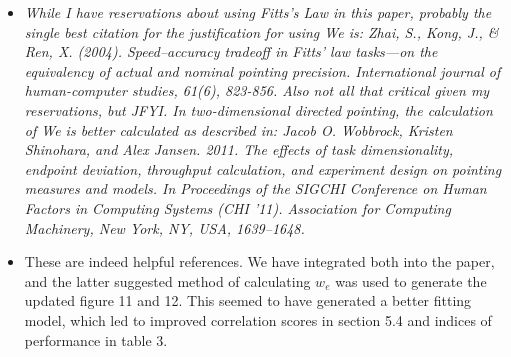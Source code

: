 \documentclass{scrartcl}
\begin{document}
\begin{itemize}

  \item \textit{While I have reservations about using Fitts's Law in this paper, probably the single best citation for the justification for using We is:
Zhai, S., Kong, J., \& Ren, X. (2004). Speed–accuracy tradeoff in Fitts' law tasks—on the equivalency of actual and nominal pointing precision. International journal of human-computer studies, 61(6), 823-856.
      Also not all that critical given my reservations, but JFYI. In two-dimensional directed pointing, the calculation of We is better calculated as described in:
    Jacob O. Wobbrock, Kristen Shinohara, and Alex Jansen. 2011. The effects of task dimensionality, endpoint deviation, throughput calculation, and experiment design on pointing measures and models. In Proceedings of the SIGCHI Conference on Human Factors in Computing Systems (CHI '11). Association for Computing Machinery, New York, NY, USA, 1639–1648.}
  \item[] These are indeed helpful references. We have integrated both into the paper, and the latter suggested method of calculating $w_e$ was used to generate the updated figure 11 and 12. This seemed to have generated a better fitting model, which led to improved correlation scores in section 5.4 and indices of performance in table 3.
    

\end{itemize}
\end{document}
